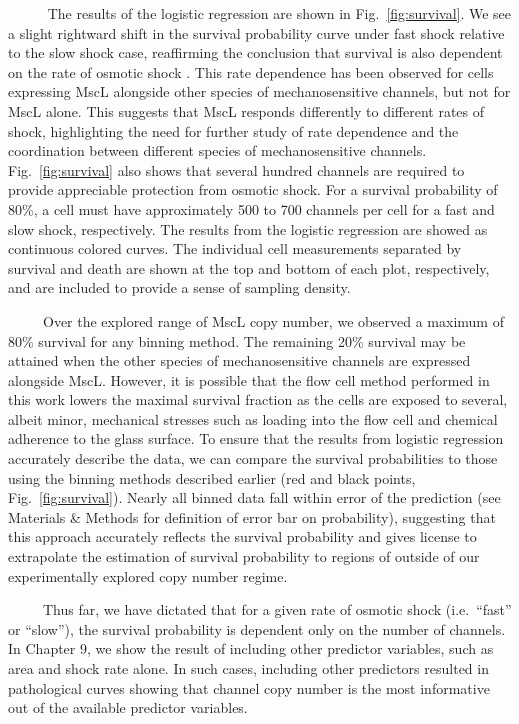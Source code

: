 \documentclass[12pt]{caltech_thesis}
\begin{document}
~~~~~ The results of the logistic regression are shown in
Fig.~\ref{fig:survival}. We see a slight rightward shift in the survival
probability curve under fast shock relative to the slow shock case,
reaffirming the conclusion that survival is also dependent on the rate
of osmotic shock \autocite{bialecka-fornal2015}. This rate dependence
has been observed for cells expressing MscL alongside other species of
mechanosensitive channels, but not for MscL alone. This suggests that
MscL responds differently to different rates of shock, highlighting the
need for further study of rate dependence and the coordination between
different species of mechanosensitive channels. Fig.~\ref{fig:survival}
also shows that several hundred channels are required to provide
appreciable protection from osmotic shock. For a survival probability of
80\%, a cell must have approximately 500 to 700 channels per cell for a
fast and slow shock, respectively. The results from the logistic
regression are showed as continuous colored curves. The individual cell
measurements separated by survival and death are shown at the top and
bottom of each plot, respectively, and are included to provide a sense
of sampling density.

~~~~~Over the explored range of MscL copy number, we observed a maximum
of 80\% survival for any binning method. The remaining 20\% survival may
be attained when the other species of mechanosensitive channels are
expressed alongside MscL. However, it is possible that the flow cell
method performed in this work lowers the maximal survival fraction as
the cells are exposed to several, albeit minor, mechanical stresses such
as loading into the flow cell and chemical adherence to the glass
surface. To ensure that the results from logistic regression accurately
describe the data, we can compare the survival probabilities to those
using the binning methods described earlier (red and black points,
Fig.~\ref{fig:survival}). Nearly all binned data fall within error of
the prediction (see Materials \& Methods for definition of error bar on
probability), suggesting that this approach accurately reflects the
survival probability and gives license to extrapolate the estimation of
survival probability to regions of outside of our experimentally
explored copy number regime.

~~~~~Thus far, we have dictated that for a given rate of osmotic shock
(i.e.~``fast'' or ``slow''), the survival probability is dependent only
on the number of channels. In Chapter 9, we show the result of including
other predictor variables, such as area and shock rate alone. In such
cases, including other predictors resulted in pathological curves
showing that channel copy number is the most informative out of the
available predictor variables.
\end{document}

